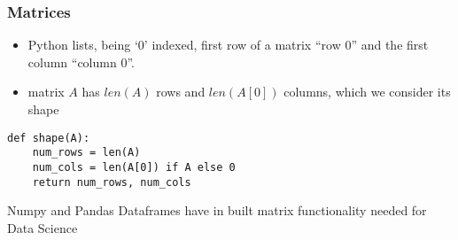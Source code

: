 \begin{frame}[fragile]\frametitle{Matrices}
\begin{itemize}
\item  Python lists, being `0' indexed, first row of a matrix ``row 0'' and the first column ``column 0''.
\item  matrix  $A$  has  $len(A)$  rows and  $len(A[0])$ columns, which we consider its  shape
\end{itemize}
\begin{lstlisting}
def shape(A):
    num_rows = len(A)
    num_cols = len(A[0]) if A else 0 
    return num_rows, num_cols
\end{lstlisting}
Numpy and Pandas Dataframes have in built matrix functionality needed for Data Science
\end{frame}
